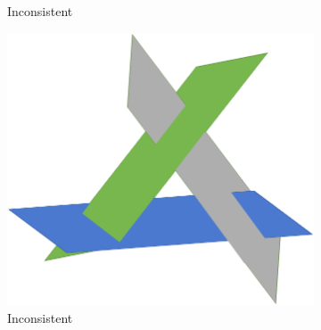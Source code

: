 \documentclass[10pt, journal, letterpaper]{IEEEtran}
\begin{document}
\begin{figure}
\begin{subfigure}{0.49\columnwidth}
          \caption{Inconsistent}
          \label{fig:linear_systems_inconsistent1}
    \end{subfigure}
    \begin{subfigure}{0.49\columnwidth}
          \centering
          \includegraphics[width=\columnwidth]{img/Inconsistent3D2.png}
          \caption{Inconsistent}
          \label{fig:linear_systems_inconsistent2}
    \end{subfigure}
    \begin{subfigure}{0.49\columnwidth}
          \centering

\end{subfigure}
\end{figure}
\end{document}
